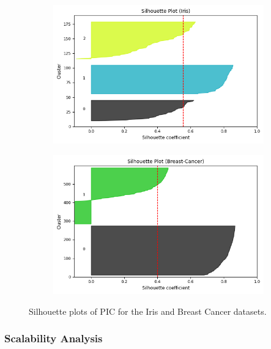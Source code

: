 \begin{figure}[htb]
    \centering
    \begin{subfigure}[b]{0.49\textwidth}
        \centering
        \includegraphics[width=\textwidth]{../results/plots/Iris.png}
    \end{subfigure}
    \hfill
    \begin{subfigure}[b]{0.49\textwidth}
        \centering
        \includegraphics[width=\textwidth]{../results/plots/Breast-Cancer.png}
    \end{subfigure}

    \caption{Silhouette plots of PIC for the Iris and Breast Cancer datasets.}
    \label{fig:silhouette}
\end{figure}

\subsubsection{Scalability Analysis}

